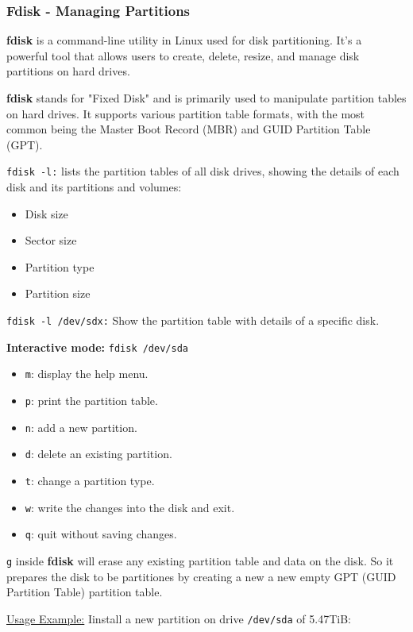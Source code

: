 \documentclass{article}
\newenvironment{blocktemplateIII}[1]{%
    \tcolorbox[beamer,%
    noparskip,breakable,
    ,colframe=Red,%
    colbacklower=LimeGreen!75!LightGreen,%
    title=#1]}%
    {\endtcolorbox}
\begin{document}
\subsubsection{Fdisk - Managing Partitions}
\textbf{fdisk} is a command-line utility in Linux used for disk partitioning. It's a powerful tool that allows users to create, delete, resize, and manage disk partitions on hard drives.

\textbf{fdisk} stands for "Fixed Disk" and is primarily used to manipulate partition tables on hard drives. It supports various partition table formats, with the most common being the Master Boot Record (MBR) and GUID Partition Table (GPT).

\verb|fdisk -l:| lists the partition tables of all disk drives, showing the details of each disk and its partitions and volumes:
\begin{itemize}
    \item Disk size
    \item Sector size
    \item Partition type
    \item Partition size
\end{itemize}

\verb|fdisk -l /dev/sdx:| Show the partition table with details of a specific disk.

\textbf{Interactive mode:} \verb|fdisk /dev/sda|
\begin{itemize}
    \item \verb|m|: display the help menu.
    \item \verb|p|: print the partition table.
    \item \verb|n|: add a new partition.
    \item \verb|d|: delete an existing partition.
    \item \verb|t|: change a partition type.
    \item \verb|w|: write the changes into the disk and exit.
    \item \verb|q|: quit without saving changes.
\end{itemize}

\begin{blocktemplateIII}{Warning}
\verb|g| inside \textbf{fdisk} will erase any existing partition table and data on the disk. So it prepares the disk to be partitiones by creating a new a new empty GPT (GUID Partition Table) partition table. 
\end{blocktemplateIII}

\underline{Usage Example:} Iinstall a new partition on drive \verb|/dev/sda| of 5.47TiB:
\end{document}
